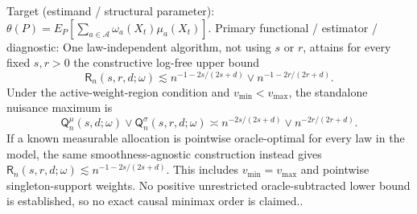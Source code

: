\documentclass{article}
\begin{document}
Target (estimand / structural parameter): \(\theta(P)=E_P[\sum_{a\in\mathcal A}\omega_a(X_t)\mu_a(X_t)]\).
Primary functional / estimator / diagnostic: One law-independent algorithm, not using \(s\) or \(r\), attains for every fixed \(s,r>0\) the constructive log-free upper bound
\[
\mathsf R_n(s,r,d;\omega)
\lesssim n^{-1-2s/(2s+d)}\vee n^{-1-2r/(2r+d)}.
\]
Under the active-weight-region condition and \(v_{\min}<v_{\max}\), the standalone nuisance maximum is
\[
\mathsf Q_n^{\mu}(s,d;\omega)\vee\mathsf Q_n^{\sigma}(s,r,d;\omega)
\asymp n^{-2s/(2s+d)}\vee n^{-2r/(2r+d)}.
\]
If a known measurable allocation is pointwise oracle-optimal for every law in the model, the same smoothness-agnostic construction instead gives \(\mathsf R_n(s,r,d;\omega)\lesssim n^{-1-2s/(2s+d)}\). This includes \(v_{\min}=v_{\max}\) and pointwise singleton-support weights. No positive unrestricted oracle-subtracted lower bound is established, so no exact causal minimax order is claimed..
\end{document}
